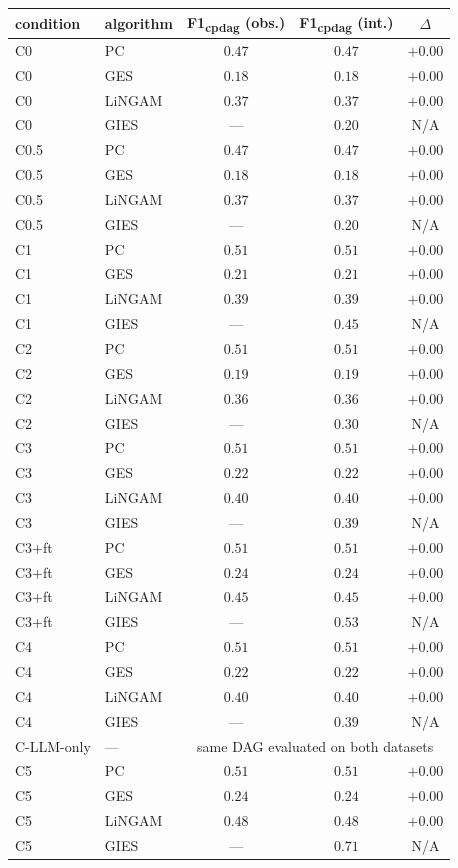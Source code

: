 \begin{tabular}{llccc}
\hline
condition & algorithm & F1\textsubscript{cpdag} (obs.) & F1\textsubscript{cpdag} (int.) & $\Delta$ \\
\hline
C0 & PC & $0.47$ & $0.47$ & $+0.00$ \\
C0 & GES & $0.18$ & $0.18$ & $+0.00$ \\
C0 & LiNGAM & $0.37$ & $0.37$ & $+0.00$ \\
C0 & GIES & --- & $0.20$ & N/A \\
C0.5 & PC & $0.47$ & $0.47$ & $+0.00$ \\
C0.5 & GES & $0.18$ & $0.18$ & $+0.00$ \\
C0.5 & LiNGAM & $0.37$ & $0.37$ & $+0.00$ \\
C0.5 & GIES & --- & $0.20$ & N/A \\
C1 & PC & $0.51$ & $0.51$ & $+0.00$ \\
C1 & GES & $0.21$ & $0.21$ & $+0.00$ \\
C1 & LiNGAM & $0.39$ & $0.39$ & $+0.00$ \\
C1 & GIES & --- & $0.45$ & N/A \\
C2 & PC & $0.51$ & $0.51$ & $+0.00$ \\
C2 & GES & $0.19$ & $0.19$ & $+0.00$ \\
C2 & LiNGAM & $0.36$ & $0.36$ & $+0.00$ \\
C2 & GIES & --- & $0.30$ & N/A \\
C3 & PC & $0.51$ & $0.51$ & $+0.00$ \\
C3 & GES & $0.22$ & $0.22$ & $+0.00$ \\
C3 & LiNGAM & $0.40$ & $0.40$ & $+0.00$ \\
C3 & GIES & --- & $0.39$ & N/A \\
C3+ft & PC & $0.51$ & $0.51$ & $+0.00$ \\
C3+ft & GES & $0.24$ & $0.24$ & $+0.00$ \\
C3+ft & LiNGAM & $0.45$ & $0.45$ & $+0.00$ \\
C3+ft & GIES & --- & $0.53$ & N/A \\
C4 & PC & $0.51$ & $0.51$ & $+0.00$ \\
C4 & GES & $0.22$ & $0.22$ & $+0.00$ \\
C4 & LiNGAM & $0.40$ & $0.40$ & $+0.00$ \\
C4 & GIES & --- & $0.39$ & N/A \\
C-LLM-only & --- & \multicolumn{3}{c}{same DAG evaluated on both datasets} \\
C5 & PC & $0.51$ & $0.51$ & $+0.00$ \\
C5 & GES & $0.24$ & $0.24$ & $+0.00$ \\
C5 & LiNGAM & $0.48$ & $0.48$ & $+0.00$ \\
C5 & GIES & --- & $0.71$ & N/A \\
\hline
\end{tabular}
